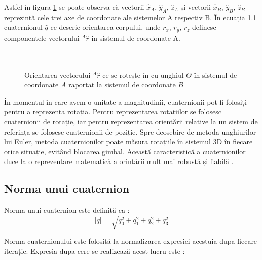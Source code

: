 \-\hspace{1cm}Astfel în figura \ref{fig:quat} se poate observa că vectorii $\hat{x}_A$, $\hat{y}_A$, $\hat{z}_A$ și vectorii $\hat{x}_B$, $\hat{y}_B$, $\hat{z}_B$ reprezintă cele trei axe de coordonate ale sistemelor A respectiv B.   În ecuația 1.1 cuaternionul $\hat{q} $ ce  descrie orientarea corpului, unde $r_x$, $r_y$, $r_z$ definesc componentele vectorului ${}^{A}\hat{r}$  in sistemul de coordonate A.\\ \\ \\


\begin{figure}[h!]
  \centering
  \caption{Orientarea vectorului ${}^{A}\hat{r}$ ce se rotește în cu unghiul $\Theta$ în sistemul de coordonate $A$ raportat la sistemul de coordonate $B$ }\label{fig:quat}
\end{figure}



\-\hspace{1cm}În momentul în care avem o unitate a magnitudinii, cuaternionii pot fi folosiți pentru a reprezenta rotația. Pentru reprezentarea rotațiilor se folosesc cuaternionii de rotație, iar pentru reprezentarea orientării relative la un sistem de referința se folosesc cuaternionii de poziție. Spre deosebire de metoda unghiurilor lui Euler, metoda cuaternionilor poate măsura rotațiile în sistemul 3D în fiecare orice situație, evitând blocarea gimbal. Această caracteristică a cuaternionilor duce la o reprezentare matematică a orintării mult mai robustă și fiabilă \cite{quatro}.


\subsection{Norma unui cuaternion}

\-\hspace{1cm}Norma unui cuaternion este definită ca :
\begin{equation}
|q|=\sqrt{q_0^2+q_1^2+q_2^2+q_3^2}
\end{equation}

\-\hspace{1cm}Norma cuaternionului este folosită la normalizarea expresiei acestuia dupa fiecare iterație. Expresia dupa cere se realizează acest lucru este \cite{quatro}: 

